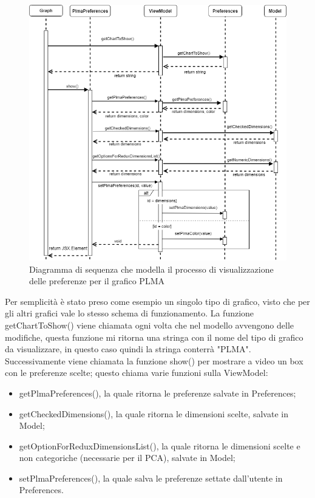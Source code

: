 \begin{figure}[hb]
\includegraphics[width=14cm]{Images/Allegato Tecnico-Sequenza-PLMApref}
\centering
\caption{Diagramma di sequenza che modella il processo di visualizzazione delle preferenze per il grafico PLMA}
\end{figure}
Per semplicità è stato preso come esempio un singolo tipo di grafico, visto che per gli altri grafici vale lo stesso schema di funzionamento.
La funzione getChartToShow() viene chiamata ogni volta che nel modello avvengono delle modifiche, questa funzione mi ritorna una stringa con il nome del tipo di grafico da visualizzare, in questo caso quindi la stringa conterrà "PLMA".
Successivamente viene chiamata la funzione show() per mostrare a video un box con le preferenze scelte; questo chiama varie funzioni sulla ViewModel:
\begin{itemize}
\item getPlmaPreferences(), la quale ritorna le preferenze salvate in Preferences;
\item getCheckedDimensions(), la quale ritorna le dimensioni scelte, salvate in Model;
\item getOptionForReduxDimensionsList(), la quale ritorna le dimensioni scelte e non categoriche (necessarie per il PCA), salvate in Model;
\item setPlmaPreferences(), la quale salva le preferenze settate dall'utente in Preferences.
\end{itemize}
